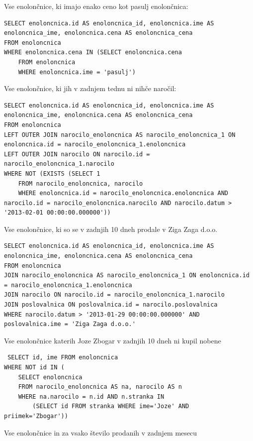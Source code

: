 \documentclass[12pt]{article}
\begin{document}
Vse enolončnice, ki imajo enako ceno kot pasulj enolončnica:

\begin{verbatim}
SELECT enoloncnica.id AS enoloncnica_id, enoloncnica.ime AS enoloncnica_ime, enoloncnica.cena AS enoloncnica_cena 
FROM enoloncnica 
WHERE enoloncnica.cena IN (SELECT enoloncnica.cena 
    FROM enoloncnica 
    WHERE enoloncnica.ime = 'pasulj')
\end{verbatim}

Vse enolončnice, ki jih v zadnjem tednu ni nihče naročil:

\begin{verbatim}
SELECT enoloncnica.id AS enoloncnica_id, enoloncnica.ime AS enoloncnica_ime, enoloncnica.cena AS enoloncnica_cena 
FROM enoloncnica
LEFT OUTER JOIN narocilo_enoloncnica AS narocilo_enoloncnica_1 ON enoloncnica.id = narocilo_enoloncnica_1.enoloncnica
LEFT OUTER JOIN narocilo ON narocilo.id = narocilo_enoloncnica_1.narocilo 
WHERE NOT (EXISTS (SELECT 1 
    FROM narocilo_enoloncnica, narocilo 
    WHERE enoloncnica.id = narocilo_enoloncnica.enoloncnica AND narocilo.id = narocilo_enoloncnica.narocilo AND narocilo.datum > '2013-02-01 00:00:00.000000'))
\end{verbatim}

Vse enolončnice, ki so se v zadnjih 10 dneh prodale v Ziga Zaga d.o.o.

\begin{verbatim}
SELECT enoloncnica.id AS enoloncnica_id, enoloncnica.ime AS enoloncnica_ime, enoloncnica.cena AS enoloncnica_cena 
FROM enoloncnica
JOIN narocilo_enoloncnica AS narocilo_enoloncnica_1 ON enoloncnica.id = narocilo_enoloncnica_1.enoloncnica
JOIN narocilo ON narocilo.id = narocilo_enoloncnica_1.narocilo
JOIN poslovalnica ON poslovalnica.id = narocilo.poslovalnica 
WHERE narocilo.datum > '2013-01-29 00:00:00.000000' AND poslovalnica.ime = 'Ziga Zaga d.o.o.'
\end{verbatim}

Vse enolončnice katerih Joze Zbogar v zadnjih 10 dneh ni kupil nobene

\begin{verbatim}
 SELECT id, ime FROM enoloncnica
WHERE NOT id IN (
    SELECT enoloncnica
    FROM narocilo_enoloncnica AS na, narocilo AS n
    WHERE na.narocilo = n.id AND n.stranka IN
        (SELECT id FROM stranka WHERE ime='Joze' AND priimek='Zbogar'))
\end{verbatim}
    

Vse enolončnice in za vsako število prodanih v zadnjem mesecu
\end{document}

